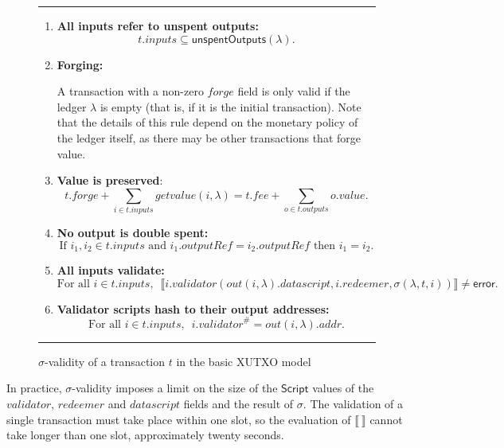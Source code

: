 \documentclass[a4paper]{article}
\theoremstyle{definition}  %
\newcommand\rfskip{7pt}
\newenvironment{ruledfigure}[1]{\begin{figure}[#1]\hrule\vspace{\rfskip}}{\vspace{\rfskip}\hrule\end{figure}}
\newcommand{\mi}[1]{\ensuremath{\mathit{#1}}}
\newcommand{\inputs}{\mi{inputs}}
\newcommand{\outputs}{\mi{outputs}}
\newcommand{\forge}{\mi{forge}}
\newcommand{\fee}{\mi{fee}}
\newcommand{\addr}{\mi{addr}}
\newcommand{\val}{\mi{value}}  %
\newcommand{\validator}{\mi{validator}}
\newcommand{\redeemer}{\mi{redeemer}}
\newcommand{\datascript}{\mi{datascript}}
\newcommand{\txout}{\mi{out}}
\newcommand{\getvalue}{\mi{getvalue}}
\newcommand{\msf}[1]{\ensuremath{\mathsf{#1}}}
\newcommand{\unspent}{\msf{unspentOutputs}}
\begin{document}
\begin{ruledfigure}{H}
\begin{enumerate}
    \item \label{all-inputs-refer-to-unspent-outputs} \textbf{All
      inputs refer to unspent outputs:}
      \[
        t.\inputs \subseteq \unspent(\lambda).
      \]
    \item\label{forging} \textbf{Forging:}
      \begin{center}
        \parbox{0.8\textwidth}{
        A transaction with a non-zero \forge{} field is only
        valid if the ledger $\lambda$ is empty
        (that is, if it is the initial
        transaction). Note that the details of this rule depend on the
        monetary policy of the ledger itself, as there may be other
        transactions that forge value.
        }
    \end{center}
      
    \item \label{value-is-preserved} \textbf{Value is preserved}:
    \[
      t.\forge + \sum_{i \in t.\inputs} \getvalue(i, \lambda) = t.\fee + \sum_{o \in t.\outputs} o.\val.
    \]
    \item \label{no-double-spending} \textbf{No output is double spent:}
    \[
     \textrm{If } i_1, i_2 \in t.\inputs \textrm{ and }  i_1.\mathit{outputRef} = i_2.\mathit{outputRef}
     \textrm{ then } i_1 = i_2.
    \]
    \item\label{all-inputs-validate} \textbf{All inputs validate:}
    \[
    \textrm{For all } i \in t.\inputs,\enspace \llbracket
    i.\validator(\txout(i, \lambda).\datascript,i.\redeemer, \sigma(\lambda, t, i)) \rrbracket \ne \textsf{error}.
      \]
    \item\label{validator-scripts-hash} \textbf{Validator scripts hash to their output addresses:}
    \[
      \textrm{For all } i \in t.\inputs,\enspace i.\validator^{\#} = \txout(i, \lambda).\addr.
    \]
\end{enumerate}
\caption{$\sigma$-validity of a transaction $t$ in the basic XUTXO model}
\label{fig:basic-xutxo-validity}
\end{ruledfigure}



\noindent In practice, $\sigma$-validity imposes a limit on the size of the
$\mathsf{Script}$ values of the $\validator$, $\redeemer$ and
$\datascript$ fields and the result of $\sigma$. The validation of a
single transaction must take place within one slot, so the evaluation
of $\llbracket ~ \rrbracket$ cannot take longer than one slot,
approximately twenty seconds.
\end{document}
